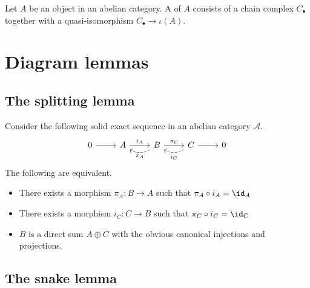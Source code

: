 \documentclass[main.tex]{subfiles}
\begin{document}
\begin{definition}[resolution]
  \label{def:resolution}
  Let $A$ be an object in an abelian category. A  of $A$ consists of a chain complex $C_{\bullet}$ together with a quasi-isomorphism $C_{\bullet} \to \iota(A)$.
\end{definition}

\section{Diagram lemmas}
\label{sec:diagram_lemmas}

\subsection{The splitting lemma}
\label{ssc:the_splitting_lemma}

\begin{lemma}
  \label{lemma:splitting_lemma}
  Consider the following solid exact sequence in an abelian category $\mathcal{A}$.
  \begin{equation*}
    \begin{tikzcd}
      0
      \arrow[r]
      & A
      \arrow[r, "i_{A}"]
      & B
      \arrow[r, "\pi_{C}"]
      \arrow[l, bend left, dashed, "\pi_{A}"]
      & C
      \arrow[r]
      \arrow[l, bend left, dashed, "i_{C}"]
      & 0
    \end{tikzcd}
  \end{equation*}
  The following are equivalent.
  \begin{itemize}
    \item There exists a morphism $\pi_{A}\colon B \to A$ such that $\pi_{A} \circ i_{A} = \id_{A}$

    \item There exists a morphism $i_{C}\colon C \to B$ such that $\pi_{C} \circ i_{C} = \id_{C}$

    \item $B$ is a direct sum $A \oplus C$ with the obvious canonical injections and projections.
  \end{itemize}
\end{lemma}

\subsection{The snake lemma}
\label{ssc:the_snake_lemma}
\end{document}
